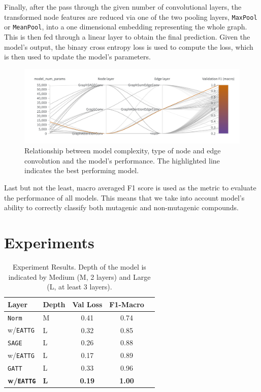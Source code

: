 \documentclass[10pt,twocolumn]{article}
\begin{document}
Finally, after the pass through the given number of convolutional layers, the transformed
node features are reduced via one of the two pooling layers, \texttt{MaxPool} or \texttt{MeanPool}, 
into a one dimensional embedding representing the whole graph. This is then fed through
a linear layer to obtain the final prediction. Given the model's output, the binary cross entropy
loss is used to compute the loss, which is then used to update the model's parameters.

\begin{figure}
    \centering
    \includegraphics[width=1\textwidth]{figures/hyperparams.png}
    \caption{Relationship between model complexity, type of node and edge convolution and the model's performance. The highlighted line indicates the best performing model.}
    \label{fig:hyperparams}
\end{figure}

Last but not the least, macro averaged F1 score is used as the metric to evaluate the performance
of all models. This means that we take into account model's ability to correctly classify both
mutagenic and non-mutagenic compounds. %

\section{Experiments}
\begin{table}[!ht]
    \centering
    \begin{tabular}{llccc}
    \toprule
    \textbf{Layer} & \textbf{Depth} & \textbf{Val Loss} & \textbf{F1-Macro} \\
    \midrule
    \texttt{Norm} & M & 0.41 & 0.74 \\
    w/\texttt{EATTG} & L & 0.32 & 0.85 \\
    \midrule
    \texttt{SAGE} & L & 0.26 & 0.88 \\
    w/\texttt{EATTG} & L & 0.17 & 0.89 \\
    \midrule
    \texttt{GATT} & L & 0.33 & 0.96 \\
    \textbf{w/\texttt{EATTG}} & \textbf{L} & \textbf{0.19} & \textbf{1.00} \\
    \bottomrule
    \end{tabular}
    \caption{Experiment Results. Depth of the model is indicated by Medium (M, 2 layers) and Large (L, at least 3 layers).}
    \label{tab:results}
\end{table}
\end{document}
